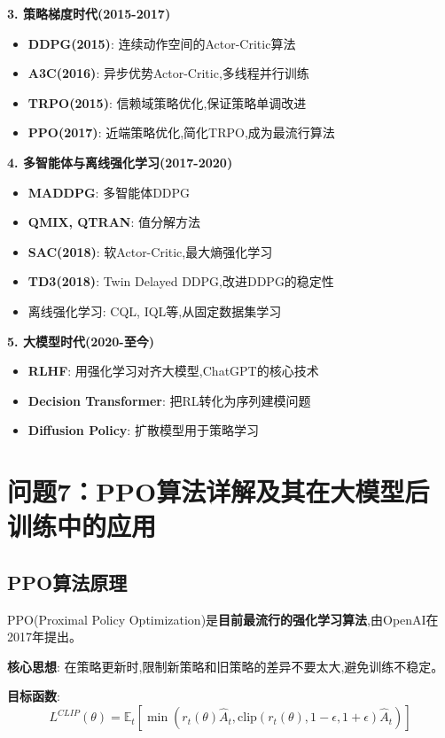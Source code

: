 \documentclass[UTF8]{ctexart}
\begin{document}
\textbf{3. 策略梯度时代(2015-2017)}
\begin{itemize}
    \item \textbf{DDPG(2015)}: 连续动作空间的Actor-Critic算法
    \item \textbf{A3C(2016)}: 异步优势Actor-Critic,多线程并行训练
    \item \textbf{TRPO(2015)}: 信赖域策略优化,保证策略单调改进
    \item \textbf{PPO(2017)}: 近端策略优化,简化TRPO,成为最流行算法
\end{itemize}

\textbf{4. 多智能体与离线强化学习(2017-2020)}
\begin{itemize}
    \item \textbf{MADDPG}: 多智能体DDPG
    \item \textbf{QMIX, QTRAN}: 值分解方法
    \item \textbf{SAC(2018)}: 软Actor-Critic,最大熵强化学习
    \item \textbf{TD3(2018)}: Twin Delayed DDPG,改进DDPG的稳定性
    \item 离线强化学习: CQL, IQL等,从固定数据集学习
\end{itemize}

\textbf{5. 大模型时代(2020-至今)}
\begin{itemize}
    \item \textbf{RLHF}: 用强化学习对齐大模型,ChatGPT的核心技术
    \item \textbf{Decision Transformer}: 把RL转化为序列建模问题
    \item \textbf{Diffusion Policy}: 扩散模型用于策略学习
\end{itemize}

\section{问题7：PPO算法详解及其在大模型后训练中的应用}

\subsection{PPO算法原理}

PPO(Proximal Policy Optimization)是\textbf{目前最流行的强化学习算法},由OpenAI在2017年提出。

\textbf{核心思想}: 在策略更新时,限制新策略和旧策略的差异不要太大,避免训练不稳定。

\textbf{目标函数}:
$$L^{CLIP}(\theta) = \mathbb{E}_t[\min(r_t(\theta)\hat{A}_t, \text{clip}(r_t(\theta), 1-\epsilon, 1+\epsilon)\hat{A}_t)]$$
\end{document}
